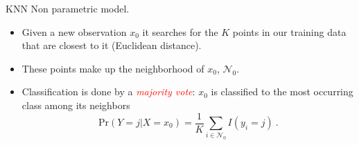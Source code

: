 \documentclass[
  10pt,
  ignorenonframetext,
]{beamer}
\providecommand{\tightlist}{%
  \setlength{\itemsep}{0pt}\setlength{\parskip}{0pt}}
\begin{document}
\begin{frame}{KNN}
\protect\hypertarget{knn}{}
Non parametric model.

\vspace{1mm}

\begin{itemize}
\tightlist
\item
  Given a new observation \(x_0\) it searches for the \(K\) points in
  our training data that are closest to it (Euclidean distance).
\end{itemize}

\vspace{1mm}

\begin{itemize}
\tightlist
\item
  These points make up the neighborhood of \(x_0\), \(\mathcal{N}_0\).
\end{itemize}

\vspace{1mm}

\begin{itemize}
\tightlist
\item
  Classification is done by a \emph{\textcolor{red}{majority vote}}:
  \(x_0\) is classified to the most occurring class among its neighbors
  \[\text{Pr}(Y=j | X = x_0) = \frac{1}{K} \sum_{i \in \mathcal{N}_0} I(y_i = j)\ .\]
\end{itemize}
\end{frame}
\end{document}
